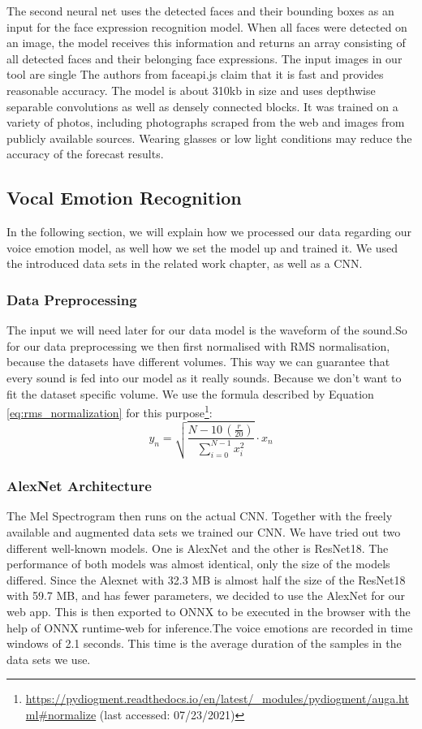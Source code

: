 The second neural net uses the detected faces and their bounding boxes as an input for the face expression recognition model. When all faces were detected on an image, the model receives this information and returns an array consisting of all detected faces and their belonging face expressions. The input images in our tool are single The authors from faceapi.js claim that it is fast and provides reasonable accuracy. The model is about 310kb in size and uses depthwise separable convolutions as well as densely connected blocks. It was trained on a variety of photos, including photographs scraped from the web and images from publicly available sources. Wearing glasses or low light conditions may reduce the accuracy of the forecast results.


\subsection{Vocal Emotion Recognition}
\label{subsec:method_vocal_emotion_recognition}
In the following section, we will explain how we processed our data regarding our voice emotion model, as well how we set the model up and trained it. We used the introduced data sets in the related work chapter, as well as a CNN. 

\subsubsection{Data Preprocessing}
\label{subsubsec:method_vocal_emotion_recognition_data_preprocessing}
The input we will need later for our data model is the waveform of the sound.So for our data preprocessing we then first normalised with RMS normalisation, because the datasets have different volumes. This way we can guarantee that every sound is fed into our model as it really sounds. Because we don't want to fit the dataset specific volume. We use the formula described by Equation \ref{eq:rms_normalization} for this purpose\footnote{\url{https://pydiogment.readthedocs.io/en/latest/_modules/pydiogment/auga.html#normalize} (last accessed: 07/23/2021)}:
\begin{equation}
\label{eq:rms_normalization}
y_n=\sqrt{\frac{N-10\,(\frac{r}{20})}{\sum_{i=0}^{N-1}{x_i^2}}}\cdot{}x_n
\end{equation}

\subsubsection{AlexNet Architecture}
\label{subsubsec:method_vocal_emotion_recognition_alexnet_architecture}
The Mel Spectrogram then runs on the actual CNN. Together with the freely available and augmented data sets we trained our CNN. We have tried out two different well-known models. One is AlexNet and the other is ResNet18. The performance of both models was almost identical, only the size of the models differed. Since the Alexnet with 32.3 MB is almost half the size of the ResNet18 with 59.7 MB, and has fewer parameters, we decided to use the AlexNet for our web app. This is then exported to ONNX to be executed in the browser with the help of ONNX runtime-web for inference.The voice emotions are recorded in time windows of 2.1 seconds. This time is the average duration of the samples in the data sets we use.
